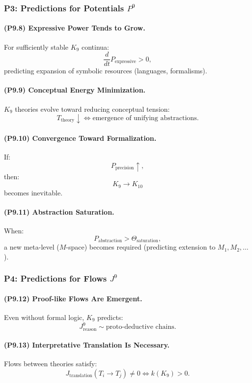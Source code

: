 \subsubsection{P3: Predictions for Potentials \texorpdfstring{$P^9$}{P^9}}

\paragraph{(P9.8) Expressive Power Tends to Grow.}
For sufficiently stable $K_9$ continua:
\[
\frac{d}{dt} P_{\mathrm{expressive}} > 0,
\]
predicting expansion of symbolic resources (languages, formalisms).

\paragraph{(P9.9) Conceptual Energy Minimization.}
$K_9$ theories evolve toward reducing conceptual tension:
\[
T_{\mathrm{theory}} \downarrow
\iff
\text{emergence of unifying abstractions}.
\]

\paragraph{(P9.10) Convergence Toward Formalization.}
If:
\[
P_{\mathrm{precision}} \uparrow,
\]
then:
\[
K_9 \to K_{10}
\]
becomes inevitable.

\paragraph{(P9.11) Abstraction Saturation.}
When:
\[
P_{\mathrm{abstraction}} > \Theta_{\mathrm{saturation}},
\]
a new meta-level ($M$-space) becomes required (predicting extension to $M_1, M_2,\ldots$).

\subsubsection{P4: Predictions for Flows \texorpdfstring{$J^9$}{J^9}}

\paragraph{(P9.12) Proof-like Flows Are Emergent.}
Even without formal logic, $K_9$ predicts:
\[
J_{\mathrm{reason}}^9
\sim
\text{proto-deductive chains}.
\]

\paragraph{(P9.13) Interpretative Translation Is Necessary.}
Flows between theories satisfy:
\[
J_{\mathrm{translation}}(T_i \to T_j) \neq 0
\iff
k(K_9) > 0.
\]

